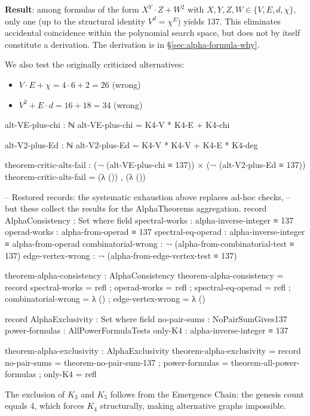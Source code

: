 \documentclass[11pt,a4paper]{book}
\begin{document}
\noindent\textbf{Result}: among formulas of the form
$X^Y \cdot Z + W^2$ with $X, Y, Z, W \in \{V, E, d, \chi\}$,
only one (up to the structural identity $V^d = \chi^E$)
yields 137. This eliminates accidental coincidence within the polynomial search
space, but does not by itself constitute a derivation. The derivation is in
\S\ref{sec:alpha-formula-why}.

We also test the originally criticized alternatives:
\begin{itemize}
\item $V \cdot E + \chi = 4 \cdot 6 + 2 = 26$ \quad (wrong)
\item $V^2 + E \cdot d = 16 + 18 = 34$ \quad (wrong)
\end{itemize}

\begin{code}
alt-VE-plus-chi : ℕ
alt-VE-plus-chi = K4-V * K4-E + K4-chi

alt-V2-plus-Ed : ℕ
alt-V2-plus-Ed = K4-V * K4-V + K4-E * K4-deg

theorem-critic-alts-fail : (¬ (alt-VE-plus-chi ≡ 137)) × (¬ (alt-V2-plus-Ed ≡ 137))
theorem-critic-alts-fail = (λ ()) , (λ ())

-- Restored records: the systematic exhaustion above replaces ad-hoc checks,
-- but these collect the results for the AlphaTheorems aggregation.
record AlphaConsistency : Set where
  field
    spectral-works     : alpha-inverse-integer ≡ 137
    operad-works       : alpha-from-operad ≡ 137
    spectral-eq-operad : alpha-inverse-integer ≡ alpha-from-operad
    combinatorial-wrong : ¬ (alpha-from-combinatorial-test ≡ 137)
    edge-vertex-wrong   : ¬ (alpha-from-edge-vertex-test ≡ 137)

theorem-alpha-consistency : AlphaConsistency
theorem-alpha-consistency = record
  { spectral-works     = refl
  ; operad-works       = refl
  ; spectral-eq-operad = refl
  ; combinatorial-wrong = λ ()
  ; edge-vertex-wrong   = λ ()
  }

record AlphaExclusivity : Set where
  field
    no-pair-sums   : NoPairSumGives137
    power-formulas : AllPowerFormulaTests
    only-K4        : alpha-inverse-integer ≡ 137

theorem-alpha-exclusivity : AlphaExclusivity
theorem-alpha-exclusivity = record
  { no-pair-sums   = theorem-no-pair-sum-137
  ; power-formulas = theorem-all-power-formulas
  ; only-K4        = refl
  }
\end{code}

The exclusion of $K_3$ and $K_5$ follows from the Emergence Chain: the genesis count equals 4, 
which forces $K_4$ structurally, making alternative graphs impossible.
\end{document}
